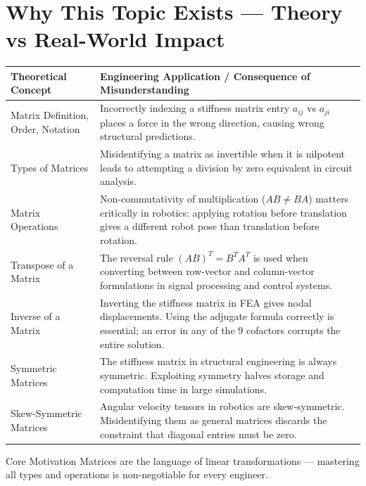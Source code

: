 \documentclass[12pt,a4paper]{article}
\begin{document}
\section{Why This Topic Exists --- Theory vs Real-World Impact}

\begin{center}
\begin{tabular}{@{}p{5.5cm}p{9cm}@{}}
\toprule
\textbf{Theoretical Concept} & \textbf{Engineering Application / Consequence of Misunderstanding} \\
\midrule
Matrix Definition, Order, Notation & Incorrectly indexing a stiffness matrix entry $a_{ij}$ vs $a_{ji}$ places a force in the wrong direction, causing wrong structural predictions. \\
\addlinespace
Types of Matrices & Misidentifying a matrix as invertible when it is nilpotent leads to attempting a division by zero equivalent in circuit analysis. \\
\addlinespace
Matrix Operations & Non-commutativity of multiplication ($AB \neq BA$) matters critically in robotics: applying rotation before translation gives a different robot pose than translation before rotation. \\
\addlinespace
Transpose of a Matrix & The reversal rule $(AB)^T = B^T A^T$ is used when converting between row-vector and column-vector formulations in signal processing and control systems. \\
\addlinespace
Inverse of a Matrix & Inverting the stiffness matrix in FEA gives nodal displacements. Using the adjugate formula correctly is essential; an error in any of the 9 cofactors corrupts the entire solution. \\
\addlinespace
Symmetric Matrices & The stiffness matrix in structural engineering is always symmetric. Exploiting symmetry halves storage and computation time in large simulations. \\
\addlinespace
Skew-Symmetric Matrices & Angular velocity tensors in robotics are skew-symmetric. Misidentifying them as general matrices discards the constraint that diagonal entries must be zero. \\
\bottomrule
\end{tabular}
\end{center}

\begin{learnbox}{Core Motivation}
Matrices are the language of linear transformations --- mastering all types and operations is non-negotiable for every engineer.
\end{learnbox}
\end{document}
